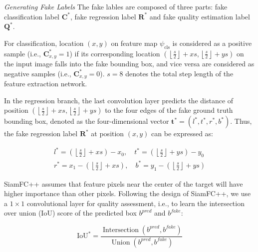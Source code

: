\documentclass[journal]{IEEEtran}
\begin{document}
\textit{Generating Fake Labels} The fake lables are composed of three parts: fake classification label $\textbf{C}^*$, fake regression label $\textbf{R}^*$ and fake quality estimation label $\textbf{Q}^*$.

For classification, location $(x,y)$ on feature map $\psi_{\mathrm{cls}}$ is considered as a positive sample (i.e., $\textbf{C}^*_{x,y} = 1$) if its corresponding location $\left(\left\lfloor\frac{s}{2}\right\rfloor+x s,\left\lfloor\frac{s}{2}\right\rfloor+y s\right)$ on the input image falls into the fake bounding box, and vice versa are considered as negative samples (i.e., $\textbf{C}^*_{x,y} = 0$). $s=8$ denotes the total step length of the feature extraction network.

In the regression branch, the last convolution layer predicts the distance of position $\left(\left\lfloor\frac{s}{2}\right\rfloor+x s,\left\lfloor\frac{s}{2}\right\rfloor+y s\right)$ to the four edges of the fake ground truth bounding box, denoted as the four-dimensional vector $\boldsymbol{t}^{*}=\left(l^{*}, t^{*}, r^{*}, b^{*}\right)$. Thus, the fake regression label $\textbf{R}^*$ at position $(x,y)$ can be expressed as:

\begin{equation}
  \begin{array}{ll}
  l^{*}=\left(\left\lfloor\frac{s}{2}\right\rfloor+x s\right)-x_{0}, \quad t^{*}=\left(\left\lfloor\frac{s}{2}\right\rfloor+y s\right)-y_{0} \\
  r^{*}=x_{1}-\left(\left\lfloor\frac{s}{2}\right\rfloor+x s\right), \quad b^{*}=y_{1}-\left(\left\lfloor\frac{s}{2}\right\rfloor+y s\right)
  \end{array}
\end{equation}

SiamFC++ assumes that feature pixels near the center of the target will have higher importance than other pixels. Following the design of SiamFC++, we use a $1 \times 1$ convolutional layer for quality assessment, i.e., to learn the intersection over union (IoU) score of the predicted box $b^{pred}$ and $b^{fake}$:

\begin{equation}
  \mathrm{IoU}^{*}=\frac{\operatorname{ Intersection }\left(b^{pred}, b^{fake}\right)}{\operatorname{Union}\left(b^{pred}, b^{fake}\right)}
\end{equation}
\end{document}

